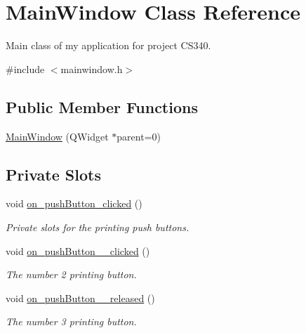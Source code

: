 \hypertarget{class_main_window}{\section{\-Main\-Window \-Class \-Reference}
\label{class_main_window}
}


\-Main class of my application for project \-C\-S340.  




{\ttfamily \#include $<$mainwindow.\-h$>$}

\subsection*{\-Public \-Member \-Functions}
\begin{DoxyCompactItemize}
\item 
\hyperlink{class_main_window_a8b244be8b7b7db1b08de2a2acb9409db}{\-Main\-Window} (\-Q\-Widget $\ast$parent=0)
\end{DoxyCompactItemize}
\subsection*{\-Private \-Slots}
\begin{DoxyCompactItemize}
\item 
void \hyperlink{class_main_window_a4de79c63c7fa0b8d7c468ac71f20be81}{on\-\_\-push\-Button\-\_\-clicked} ()
\begin{DoxyCompactList}\small\item\em \-Private slots for the printing push buttons. \end{DoxyCompactList}\item 
\hypertarget{class_main_window_ae0e46dc3da4ee07bf66e73e20300220c}{void \hyperlink{class_main_window_ae0e46dc3da4ee07bf66e73e20300220c}{on\-\_\-push\-Button\-\_\-\_\-clicked} ()}\label{class_main_window_ae0e46dc3da4ee07bf66e73e20300220c}

\begin{DoxyCompactList}\small\item\em \-The number 2 printing button. \end{DoxyCompactList}\item 
\hypertarget{class_main_window_a67b2bf235a1ff03c096b2114c23dcdee}{void \hyperlink{class_main_window_a67b2bf235a1ff03c096b2114c23dcdee}{on\-\_\-push\-Button\-\_\-\_\-released} ()}\label{class_main_window_a67b2bf235a1ff03c096b2114c23dcdee}

\begin{DoxyCompactList}\small\item\em \-The number 3 printing button. \end{DoxyCompactList}\end{DoxyCompactItemize}
